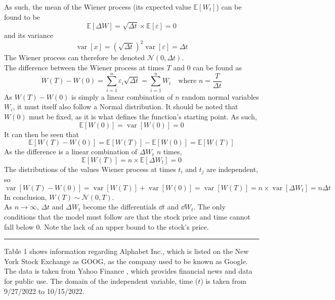 \documentclass[12pt, A4]{report}
\newcommand{\Exp}{\mathbb{E}}
\newcommand{\ndist}{\mathcal{N}}
\DeclareMathOperator{\vari}{var}
\begin{document}
		As such, the mean of the Wiener process (its expected value \(\Exp[W_t]\)) can be found to be
			\[\Exp[\Delta W] = \sqrt{\Delta t} \times \Exp[\varepsilon] = 0\]
		and its variance
			\[\vari[x] = \left(\sqrt{\Delta t}\right)^2\vari[\varepsilon] = \Delta t\]
		The Wiener process can therefore be denoted \(\ndist(0, \Delta t)\). \\
		The difference between the Wiener process at times \(T\) and 0 can be found as
		\[W(T) - W(0) = \sum_{i = 1}^n \varepsilon_i\sqrt{\Delta t} = \sum_{i = 1}^n W_i \quad \text{where } n = \frac{T}{\Delta t} \]
		As \(W(T) - W(0)\) is simply a linear combination of \(n\) random normal variables \(W_i\), it must itself also follow a Normal distribution. It should be noted that \(W(0)\) must be fixed, as it is what defines the function's starting point. As such,
		\[\Exp[W(0)] = \vari[W(0)] = 0\]
 		It can then be seen that
 		\[\Exp[W(T) - W(0)] = \Exp[W(T)] - \Exp[W(0)] = \Exp[W(T)]\]
 		As the difference is a linear combination of \(\Delta W_t\) \(n\) times,
 			\[\Exp[W(T)] = n \times \Exp[\Delta W_t] = 0\]
 		The distributions of the values Wiener process at times \(t_i\) and \(t_j\) are independent, so
 			\[\vari[W(T) - W(0)] = \vari[W(T)] + \vari[W(0)] = \vari[W(T)] = n \times \vari[\Delta W_t] = n\Delta t\]
 		In conclusion, \(W(T) \sim \ndist(0, T)\). \\
		 As \(n \to \infty\), \(\Delta t\) and \(\Delta W_t\) become the differentials \(\dd{t}\) and \(\dd{W_t}\).
	The only conditions that the model must follow are that the stock price and time cannot fall below 0. Note the lack of an upper bound to the stock's price.
	\par\noindent\rule{\textwidth}{0.5mm}
	Table 1 shows information regarding Alphabet Inc., which is listed on the New York Stock Exchange as GOOG, as the company used to be known as Google. The data is taken from Yahoo Finance \cite{Yahoo}, which provides financial news and data for public use. The domain of the independent variable, time (\(t\)) is taken from 9/27/2022 to 10/15/2022.
\end{document}
